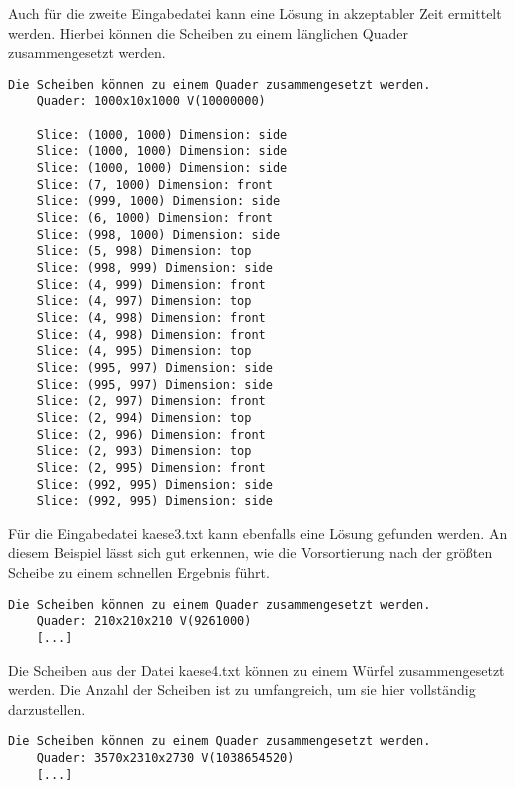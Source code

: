\documentclass[a4paper,10pt,ngerman]{scrartcl}
\begin{document}
    Auch für die zweite Eingabedatei kann eine Lösung in akzeptabler Zeit ermittelt werden.
    Hierbei können die Scheiben zu einem länglichen Quader zusammengesetzt werden.

    \begin{lstlisting}[frame=single, title=Programmausgabe kaese3.txt, breaklines=true,label={lst:lstlisting8}]
    Die Scheiben können zu einem Quader zusammengesetzt werden.
    Quader: 1000x10x1000 V(10000000)

    Slice: (1000, 1000) Dimension: side
    Slice: (1000, 1000) Dimension: side
    Slice: (1000, 1000) Dimension: side
    Slice: (7, 1000) Dimension: front
    Slice: (999, 1000) Dimension: side
    Slice: (6, 1000) Dimension: front
    Slice: (998, 1000) Dimension: side
    Slice: (5, 998) Dimension: top
    Slice: (998, 999) Dimension: side
    Slice: (4, 999) Dimension: front
    Slice: (4, 997) Dimension: top
    Slice: (4, 998) Dimension: front
    Slice: (4, 998) Dimension: front
    Slice: (4, 995) Dimension: top
    Slice: (995, 997) Dimension: side
    Slice: (995, 997) Dimension: side
    Slice: (2, 997) Dimension: front
    Slice: (2, 994) Dimension: top
    Slice: (2, 996) Dimension: front
    Slice: (2, 993) Dimension: top
    Slice: (2, 995) Dimension: front
    Slice: (992, 995) Dimension: side
    Slice: (992, 995) Dimension: side
    \end{lstlisting}

    Für die Eingabedatei kaese3.txt kann ebenfalls eine Lösung gefunden werden.
    An diesem Beispiel lässt sich gut erkennen, wie die Vorsortierung nach der größten Scheibe zu einem schnellen Ergebnis führt.

    \begin{lstlisting}[frame=single, title=Ausschnitt der Programmausgabe kaese4.txt, breaklines=true,label={lst:lstlisting9}]
    Die Scheiben können zu einem Quader zusammengesetzt werden.
    Quader: 210x210x210 V(9261000)
    [...]
    \end{lstlisting}

    Die Scheiben aus der Datei kaese4.txt können zu einem Würfel zusammengesetzt werden.
    Die Anzahl der Scheiben ist zu umfangreich, um sie hier vollständig darzustellen.

    \begin{lstlisting}[frame=single, title=Ausschnitt der Programmausgabe kaese5.txt, breaklines=true,label={lst:lstlisting10}]
    Die Scheiben können zu einem Quader zusammengesetzt werden.
    Quader: 3570x2310x2730 V(1038654520)
    [...]
    \end{lstlisting}
\end{document}
